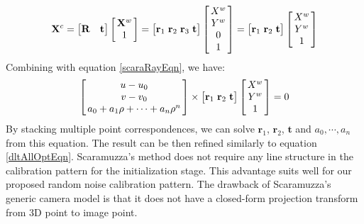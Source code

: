 \documentclass{report}
\begin{document}
\begin{equation}
\mathbf{X}^c = 
\begin{bmatrix}
\mathbf{R} & \mathbf{t}
\end{bmatrix}
\arraycolsep=1.5pt%
\begin{bmatrix}
	\begin{array}{c}
	\mathbf{X}^w \\ 1
	\end{array}
\end{bmatrix}
= 
\begin{bmatrix}
\mathbf{r}_1 & \mathbf{r}_2 & \mathbf{r}_3 & \mathbf{t}
\end{bmatrix}
\arraycolsep=1.5pt%
\begin{bmatrix}
	\begin{array}{c}
	X^w \\ Y^w \\ 0 \\ 1
	\end{array}
\end{bmatrix}
= 
\begin{bmatrix}
\mathbf{r}_1 & \mathbf{r}_2 & \mathbf{t}
\end{bmatrix}
\arraycolsep=1.5pt%
\begin{bmatrix}
	\begin{array}{c}
	X^w \\ Y^w \\ 1
	\end{array}
\end{bmatrix}
\label{planarEqn}
\end{equation}
Combining with equation \ref{scaraRayEqn}, we have: 
\begin{equation}
\arraycolsep=1.5pt%
\begin{bmatrix}
	\begin{array}{c}
	u - u_0 \\ v - v_0 \\ a_0 + a_1 \rho + \cdots + a_n \rho^n
	\end{array}
\end{bmatrix} 
\times
\begin{bmatrix}
\mathbf{r}_1 & \mathbf{r}_2 & \mathbf{t}
\end{bmatrix}
\arraycolsep=1.5pt%
\begin{bmatrix}
	\begin{array}{c}
	X^w \\ Y^w \\ 1
	\end{array}
\end{bmatrix}
= 0
\end{equation}
By stacking multiple point correspondences, we can solve $\mathbf{r}_1$, $\mathbf{r}_2$, $\mathbf{t}$ and $a_0, \cdots, a_n$ from this equation. The result can be then refined similarly to equation \ref{dltAllOptEqn}. Scaramuzza's method does not require any line structure in the calibration pattern for the initialization stage. This advantage suits well for our proposed random noise calibration pattern. The drawback of Scaramuzza's generic camera model is that it does not have a closed-form projection transform from 3D point to image point. 
\end{document}
